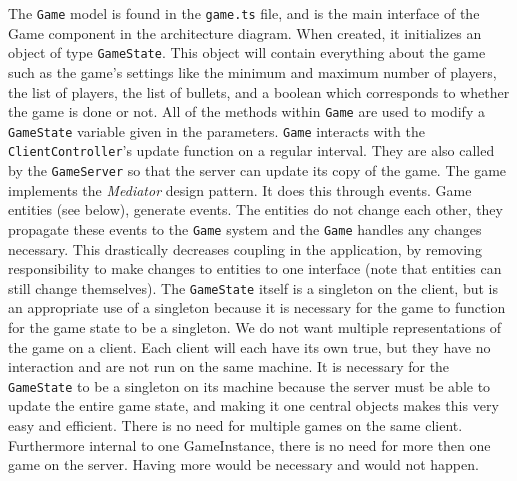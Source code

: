 \documentclass[12pt]{report}
\begin{document}
The \texttt{Game} model is found in the \texttt{game.ts} file, and is the main interface of the Game component in the architecture diagram. When created, it initializes an object of type \texttt{GameState}. This object will contain everything about the game such as the game's settings like the minimum and maximum number of players, the list of players, the list of bullets, and a boolean which corresponds to whether the game is done or not. All of the methods within \texttt{Game} are used to modify a \texttt{GameState} variable given in the parameters. \texttt{Game} interacts with the \texttt{ClientController}'s update function on a regular interval. They are also called by the \texttt{GameServer} so that the server can update its copy of the game. The game implements the \textit{Mediator} design pattern. It does this through events. Game entities (see below), generate events. The entities do not change each other, they propagate these events to the \texttt{Game} system and the \texttt{Game} handles any changes necessary. This drastically decreases coupling in the application, by removing responsibility to make changes to entities to one interface (note that entities can still change themselves). The \texttt{GameState} itself is a singleton on the client, but is an appropriate use of a singleton because it is necessary for the game to function for the game state to be a singleton. We do not want multiple representations of the game on a client. Each client will each have its own true, but they have no interaction and are not run on the same machine. It is necessary for the \texttt{GameState} to be a singleton on its machine because the server must be able to update the entire game state, and making it one central objects makes this very easy and efficient. There is no need for multiple games on the same client. Furthermore internal to one GameInstance, there is no need for more then one game on the server. Having more would be necessary and would not happen. 
\end{document}
